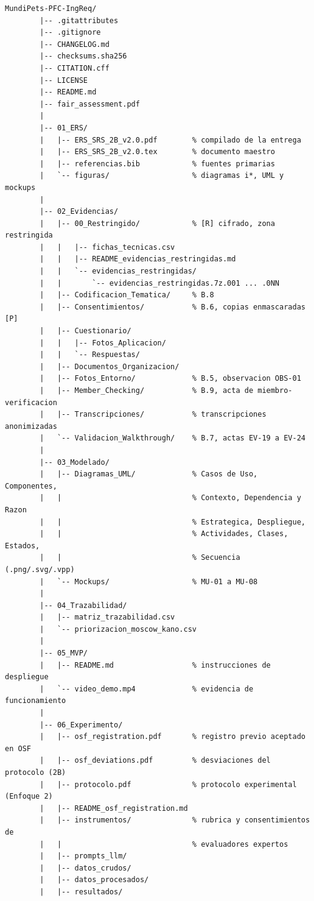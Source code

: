 \documentclass[journal,onecolumn]{IEEEtran}
\begin{document}
	\begin{lstlisting}[style=csharp,caption={Estructura de carpetas del repositorio MundiPets-PFC-IngReq, conforme a la Sección 9.1 de la Guía y Rúbrica de la Entrega 4 (2B).},label={lst:estructura_repo}]
		MundiPets-PFC-IngReq/
		|-- .gitattributes
		|-- .gitignore
		|-- CHANGELOG.md
		|-- checksums.sha256
		|-- CITATION.cff
		|-- LICENSE
		|-- README.md
		|-- fair_assessment.pdf
		|
		|-- 01_ERS/
		|   |-- ERS_SRS_2B_v2.0.pdf        % compilado de la entrega
		|   |-- ERS_SRS_2B_v2.0.tex        % documento maestro
		|   |-- referencias.bib            % fuentes primarias
		|   `-- figuras/                   % diagramas i*, UML y mockups
		|
		|-- 02_Evidencias/
		|   |-- 00_Restringido/            % [R] cifrado, zona restringida
		|   |   |-- fichas_tecnicas.csv
		|   |   |-- README_evidencias_restringidas.md
		|   |   `-- evidencias_restringidas/
		|   |       `-- evidencias_restringidas.7z.001 ... .0NN
		|   |-- Codificacion_Tematica/     % B.8
		|   |-- Consentimientos/           % B.6, copias enmascaradas [P]
		|   |-- Cuestionario/
		|   |   |-- Fotos_Aplicacion/
		|   |   `-- Respuestas/
		|   |-- Documentos_Organizacion/
		|   |-- Fotos_Entorno/             % B.5, observacion OBS-01
		|   |-- Member_Checking/           % B.9, acta de miembro-verificacion
		|   |-- Transcripciones/           % transcripciones anonimizadas
		|   `-- Validacion_Walkthrough/    % B.7, actas EV-19 a EV-24
		|
		|-- 03_Modelado/
		|   |-- Diagramas_UML/             % Casos de Uso, Componentes,
		|   |                              % Contexto, Dependencia y Razon
		|   |                              % Estrategica, Despliegue,
		|   |                              % Actividades, Clases, Estados,
		|   |                              % Secuencia (.png/.svg/.vpp)
		|   `-- Mockups/                   % MU-01 a MU-08
		|
		|-- 04_Trazabilidad/
		|   |-- matriz_trazabilidad.csv
		|   `-- priorizacion_moscow_kano.csv
		|
		|-- 05_MVP/
		|   |-- README.md                  % instrucciones de despliegue
		|   `-- video_demo.mp4             % evidencia de funcionamiento
		|
		|-- 06_Experimento/
		|   |-- osf_registration.pdf       % registro previo aceptado en OSF
		|   |-- osf_deviations.pdf         % desviaciones del protocolo (2B)
		|   |-- protocolo.pdf              % protocolo experimental (Enfoque 2)
		|   |-- README_osf_registration.md
		|   |-- instrumentos/              % rubrica y consentimientos de
		|   |                              % evaluadores expertos
		|   |-- prompts_llm/
		|   |-- datos_crudos/
		|   |-- datos_procesados/
		|   |-- resultados/

\end{lstlisting}
\end{document}
